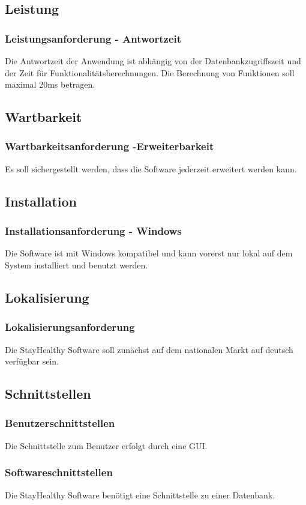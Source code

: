 \documentclass[12pt,a4paper,onecolumn]{article}
\begin{document}
\subsection{Leistung}
\subsubsection{Leistungsanforderung - Antwortzeit}
Die Antwortzeit der Anwendung ist abhängig von der Datenbankzugriffszeit und der Zeit für Funktionalitätsberechnungen.
Die Berechnung von Funktionen soll maximal 20ms betragen.
\subsection{Wartbarkeit}
\subsubsection{Wartbarkeitsanforderung -Erweiterbarkeit}
Es soll sichergestellt werden, dass die Software jederzeit erweitert werden kann.
\subsection{Installation}
\subsubsection{Installationsanforderung - Windows}
Die Software ist mit Windows kompatibel und kann vorerst nur lokal auf dem System installiert und benutzt werden.
\subsection{Lokalisierung}
\subsubsection{Lokalisierungsanforderung}
Die StayHealthy Software soll zunächst auf dem nationalen Markt auf deutsch verfügbar sein.
\subsection{Schnittstellen}
\subsubsection{Benutzerschnittstellen}
Die Schnittstelle zum Benutzer erfolgt durch eine GUI.
\subsubsection{Softwareschnittstellen}
Die StayHealthy Software benötigt eine Schnittstelle zu einer Datenbank.
\end{document}
